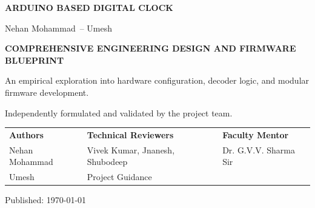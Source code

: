 \documentclass[12pt,letterpaper]{article}
\newcommand{\ProjectTitle}{Arduino Based Digital Clock}
\newcommand{\ProjectSubtitle}{Comprehensive Engineering Design and Firmware Blueprint}
\newcommand{\TeamMemberOne}{Nehan Mohammad}
\newcommand{\TeamMemberTwo}{Umesh}
\newcommand{\GuideName}{Vivek Kumar, Jnanesh, Shubodeep}
\newcommand{\SubmittedTo}{Dr. G.V.V. Sharma Sir}
\newcommand{\SubmissionDate}{\today}
\begin{document}
\begin{center}
  \vspace*{4mm}

  {\Large\bfseries \MakeUppercase{\ProjectTitle}\par}
  \vspace{0.55em}
  {\large \TeamMemberOne\ -- \TeamMemberTwo\par}

  \vspace{28mm}

  {\large\bfseries \MakeUppercase{\ProjectSubtitle}\par}

  \vspace{8mm}

  \begin{minipage}{0.80\textwidth}
    \centering
    An empirical exploration into hardware configuration, decoder logic, 
    and modular firmware development.

    \smallskip
    \small
    Independently formulated and validated by the project team.
  \end{minipage}

  \vspace{12mm}

  \begin{tabularx}{0.96\textwidth}{
    @{}
    >{\raggedright\arraybackslash}X
    >{\centering\arraybackslash}X
    >{\raggedleft\arraybackslash}X
    @{}
  }
    \textbf{Authors}
    &
    \textbf{Technical Reviewers}
    &
    \textbf{Faculty Mentor}
    \\[2mm]

    \TeamMemberOne
    &
    \GuideName
    &
    \SubmittedTo
    \\

    \TeamMemberTwo
    &
    Project Guidance
    &
    \\
  \end{tabularx}

  \vspace{10mm}

  {\large Published: \SubmissionDate\par}
\end{center}

\vspace{10mm}
\clearpage

\end{document}
